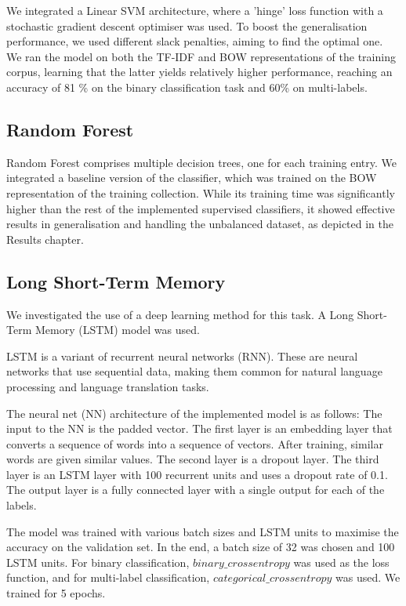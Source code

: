 \documentclass{article}
\begin{document}
We integrated a Linear SVM architecture, where a 'hinge' loss function with a stochastic gradient descent optimiser was used. To boost the generalisation performance, we used different slack penalties, aiming to find the optimal one. We ran the model on both the TF-IDF and BOW representations of the training corpus, learning that the latter yields relatively higher performance, reaching an accuracy of  81 \% on the binary classification task and 60\% on multi-labels.

\subsection{Random Forest}

Random Forest comprises multiple decision trees, one for each training entry. We integrated a baseline version of the classifier, which was trained on the BOW representation of the training collection. While its training time was significantly higher than the rest of the implemented supervised classifiers, it showed effective results in generalisation and handling the unbalanced dataset, as depicted in the Results chapter.

\subsection{Long Short-Term Memory}
We investigated the use of a deep learning method for this task. A Long Short-Term Memory (LSTM) model was used.

LSTM is a variant of recurrent neural networks (RNN). These are neural networks that use sequential data, making them common for natural language processing and language translation tasks. 

The neural net (NN) architecture of the implemented model is as follows: The input to the NN is the padded vector. The first layer is an embedding layer that converts a sequence of words into a sequence of vectors. After training, similar words are given similar values. The second layer is a dropout layer. The third layer is an LSTM layer with 100 recurrent units and uses a dropout rate of 0.1. The output layer is a fully connected layer with a single output for each of the labels.

The model was trained with various batch sizes and LSTM units to maximise the accuracy on the validation set. In the end, a batch size of 32 was chosen and 100 LSTM units. For binary classification, $binary\_crossentropy$ was used as the loss function, and for multi-label classification, $categorical\_crossentropy$ was used. We trained for 5 epochs. 
\end{document}
